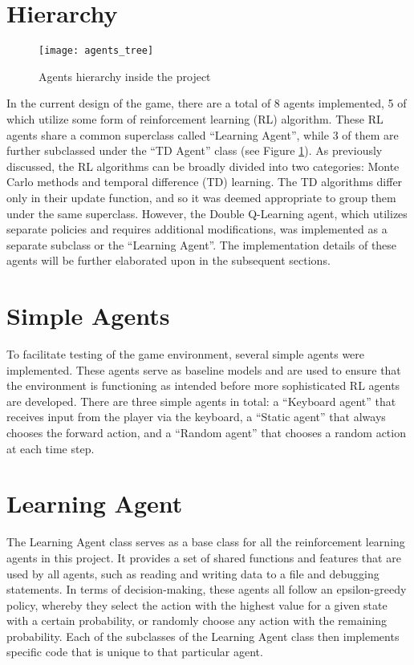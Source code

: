 \section{Hierarchy}
\begin{figure}[h]
    \centering
    \texttt{[image: agents\_tree]}
    \caption{Agents hierarchy inside the project}
    \label{fig:agents_tree}
\end{figure}

In the current design of the game, there are a total of 8 agents implemented, 5 of which utilize some form of reinforcement learning (RL) algorithm. These RL agents share a common superclass called ``Learning Agent'', while 3 of them are further subclassed under the ``TD Agent'' class (see Figure \ref{fig:agents_tree}). As previously discussed, the RL algorithms can be broadly divided into two categories: Monte Carlo methods and temporal difference (TD) learning. The TD algorithms differ only in their update function, and so it was deemed appropriate to group them under the same superclass. However, the Double Q-Learning agent, which utilizes separate policies and requires additional modifications, was implemented as a separate subclass or the ``Learning Agent''. The implementation details of these agents will be further elaborated upon in the subsequent sections.

\section{Simple Agents}
To facilitate testing of the game environment, several simple agents were implemented. These agents serve as baseline models and are used to ensure that the environment is functioning as intended before more sophisticated RL agents are developed. There are three simple agents in total: a ``Keyboard agent'' that receives input from the player via the keyboard, a ``Static agent'' that always chooses the forward action, and a ``Random agent'' that chooses a random action at each time step. 

\section{Learning Agent}
The Learning Agent class serves as a base class for all the reinforcement learning agents in this project. It provides a set of shared functions and features that are used by all agents, such as reading and writing data to a file and debugging statements. In terms of decision-making, these agents all follow an epsilon-greedy policy, whereby they select the action with the highest value for a given state with a certain probability, or randomly choose any action with the remaining probability. Each of the subclasses of the Learning Agent class then implements specific code that is unique to that particular agent.
